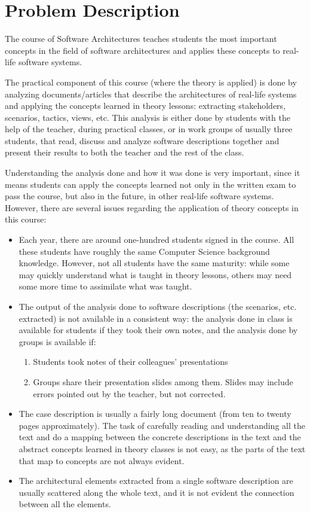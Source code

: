 
\chapter{Problem Description}
\label{chapter:problemdescription}
The course of Software Architectures teaches students the most important concepts in the field of software architectures and applies these concepts to real-life software systems.

The practical component of this course (where the theory is applied) is done by analyzing documents/articles that describe the architectures of real-life systems and applying the concepts learned in theory lessons: extracting stakeholders, scenarios, tactics, views, etc.
This analysis is either done by students with the help of the teacher, during practical classes, or in work groups of usually three students, that read, discuss and analyze software descriptions together and present their results to both the teacher and the rest of the class.

Understanding the analysis done and how it was done is very important, since it means students can apply the concepts learned not only in the written exam to pass the course, but also in the future, in other real-life software systems.
However, there are several issues regarding the application of theory concepts in this course:
\begin{itemize}
\item Each year, there are around one-hundred students signed in the course. All these students have roughly the same Computer Science background knowledge. However, not all students have the same maturity: while some may quickly understand what is taught in theory lessons, others may need some more time to assimilate what was taught.

\item The output of the analysis done to software descriptions (the scenarios, etc. extracted) is not available in a consistent way: the analysis done in class is available for students if they took their own notes, and the analysis done by groups is available if:
\begin{enumerate}
\item Students took notes of their colleagues' presentations 

\item Groups share their presentation slides among them. Slides may include errors pointed out by the teacher, but not corrected.

\end{enumerate} 
\item The case description is usually a fairly long document (from ten to twenty pages approximately). The task of carefully reading and understanding all the text and do a mapping between the concrete descriptions in the text and the abstract concepts learned in theory classes is not easy, as the parts of the text that map to concepts are not always evident.
\item The architectural elements extracted from a single software description are usually scattered along the whole text, and it is not evident the connection between all the elements.
\end{itemize}
